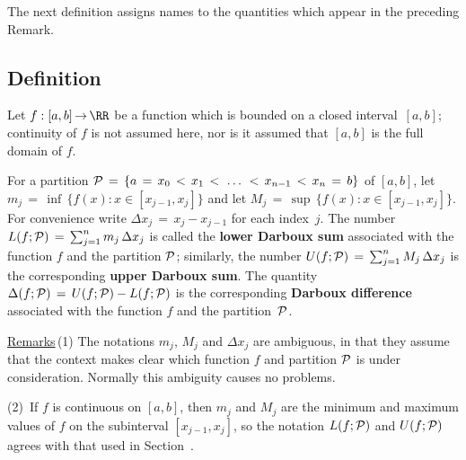 \VV

        The next definition assigns names to the quantities which appear in the preceding Remark.

\V

        \subsection{\small{{\bf Definition}}}
        \label{DefH20.20}

\V

        Let $f:[a,b] \,{\rightarrow}\, {\RR}$ be a function which is bounded on a closed interval~$[a,b]$;
    continuity of $f$ is not assumed here, nor is it assumed that $[a,b]$ is the full domain of $f$.
 
        For a partition ${\cal P} \,=\, \{a \,=\, x_{0}\,<\,x_{1}\,<\,\,{\ldots}\,\,<\,x_{n-1}\,<\,x_{n} \,=\, b\}$ of $[a,b]$,
    let $m_{j} \,=\, {\inf}\,\{f(x): x{\in}[x_{j-1}, x_{j}]\}$ and let $M_{j} \,=\, {\sup}\,\{f(x): x{\in}[x_{j-1}, x_{j}]\}$.
    For convenience write ${\Delta}x_{j} \,=\, x_{j}-x_{j-1}$ for each index~$j$.
    The number $L(f;{\cal P}) \,=\, \sum_{j=1}^{n} m_{j}\,{\Delta}x_{j}$ is called the
    {\bf lower Darboux sum}
    associated with the function $f$ and the partition ${\cal P}$; similarly, the number
    $U(f;{\cal P}) \,=\, \sum_{j=1}^{n} M_{j}\,{\Delta}x_{j}$ is the corresponding {\bf upper Darboux sum}.
    The quantity ${\Delta}(f;{\cal P}) \,=\, U(f;{\cal P})-L(f;{\cal P})$ is the corresponding
    {\bf Darboux difference} associated with the function $f$ and the partition~${\cal P}$.

\V

        \underline{Remarks}\,(1) The notations $m_{j}$, $M_{j}$ and ${\Delta}x_{j}$ are ambiguous, in that they assume that the context makes clear
    which function $f$ and partition ${\cal P}$ is under consideration. Normally this ambiguity causes no problems.

\V

        (2)\, If $f$ is continuous on $[a,b]$, then $m_{j}$ and $M_{j}$ are the minimum and maximum values of $f$ on the subinterval $[x_{j-1},x_{j}]$,
    so the notation $L(f;{\cal P})$ and $U(f;{\cal P})$ agrees with that used in Section~.

\VV

